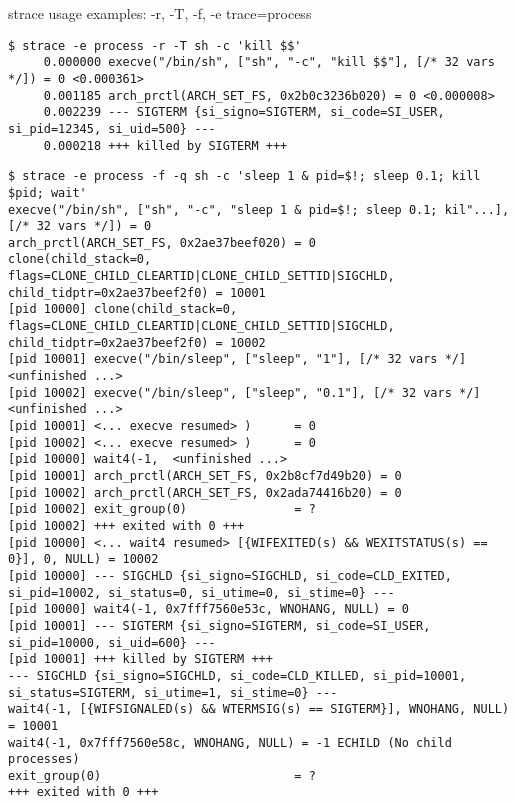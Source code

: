 \begin{frame}[fragile]{strace usage examples: -r, -T, -f, -e trace=process}
\Tiny
\begin{verbatim}
$ strace -e process -r -T sh -c 'kill $$'
     0.000000 execve("/bin/sh", ["sh", "-c", "kill $$"], [/* 32 vars */]) = 0 <0.000361>
     0.001185 arch_prctl(ARCH_SET_FS, 0x2b0c3236b020) = 0 <0.000008>
     0.002239 --- SIGTERM {si_signo=SIGTERM, si_code=SI_USER, si_pid=12345, si_uid=500} ---
     0.000218 +++ killed by SIGTERM +++
\end{verbatim}

\begin{verbatim}
$ strace -e process -f -q sh -c 'sleep 1 & pid=$!; sleep 0.1; kill $pid; wait'
execve("/bin/sh", ["sh", "-c", "sleep 1 & pid=$!; sleep 0.1; kil"...], [/* 32 vars */]) = 0
arch_prctl(ARCH_SET_FS, 0x2ae37beef020) = 0
clone(child_stack=0, flags=CLONE_CHILD_CLEARTID|CLONE_CHILD_SETTID|SIGCHLD, child_tidptr=0x2ae37beef2f0) = 10001
[pid 10000] clone(child_stack=0, flags=CLONE_CHILD_CLEARTID|CLONE_CHILD_SETTID|SIGCHLD, child_tidptr=0x2ae37beef2f0) = 10002
[pid 10001] execve("/bin/sleep", ["sleep", "1"], [/* 32 vars */] <unfinished ...>
[pid 10002] execve("/bin/sleep", ["sleep", "0.1"], [/* 32 vars */] <unfinished ...>
[pid 10001] <... execve resumed> )      = 0
[pid 10002] <... execve resumed> )      = 0
[pid 10000] wait4(-1,  <unfinished ...>
[pid 10001] arch_prctl(ARCH_SET_FS, 0x2b8cf7d49b20) = 0
[pid 10002] arch_prctl(ARCH_SET_FS, 0x2ada74416b20) = 0
[pid 10002] exit_group(0)               = ?
[pid 10002] +++ exited with 0 +++
[pid 10000] <... wait4 resumed> [{WIFEXITED(s) && WEXITSTATUS(s) == 0}], 0, NULL) = 10002
[pid 10000] --- SIGCHLD {si_signo=SIGCHLD, si_code=CLD_EXITED, si_pid=10002, si_status=0, si_utime=0, si_stime=0} ---
[pid 10000] wait4(-1, 0x7fff7560e53c, WNOHANG, NULL) = 0
[pid 10001] --- SIGTERM {si_signo=SIGTERM, si_code=SI_USER, si_pid=10000, si_uid=600} ---
[pid 10001] +++ killed by SIGTERM +++
--- SIGCHLD {si_signo=SIGCHLD, si_code=CLD_KILLED, si_pid=10001, si_status=SIGTERM, si_utime=1, si_stime=0} ---
wait4(-1, [{WIFSIGNALED(s) && WTERMSIG(s) == SIGTERM}], WNOHANG, NULL) = 10001
wait4(-1, 0x7fff7560e58c, WNOHANG, NULL) = -1 ECHILD (No child processes)
exit_group(0)                           = ?
+++ exited with 0 +++
\end{verbatim}
\end{frame}

